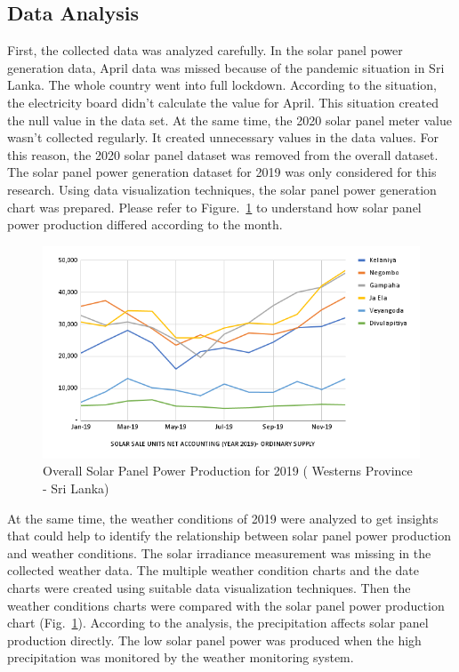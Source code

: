 \documentclass[conference]{IEEEtran}
\begin{document}
\subsection{Data Analysis}
First, the collected data was analyzed carefully. In the solar panel power generation data, April data was missed because of the pandemic situation in Sri Lanka. The whole country went into full lockdown. According to the situation, the electricity board didn't calculate the value for April. This situation created the null value in the data set. At the same time, the 2020 solar panel meter value wasn't collected regularly. It created unnecessary values in the data values. For this reason, the 2020 solar panel dataset was removed from the overall dataset. The solar panel power generation dataset for 2019 was only considered for this research. Using data visualization techniques, the solar panel power generation chart was prepared. Please refer to Figure.~\ref{fig:SolarPowerProduction} to understand how solar panel power production differed according to the month.

\begin{figure}[hbp]
    \centering
    \includegraphics[width=\linewidth]{Images/chart.png}
    \caption{Overall Solar Panel Power Production for 2019 ( Westerns Province - Sri Lanka)}
    \label{fig:SolarPowerProduction}
\end{figure}

At the same time, the weather conditions of 2019 were analyzed to get insights that could help to identify the relationship between solar panel power production and weather conditions. The solar irradiance measurement was missing in the collected weather data. The multiple weather condition charts and the date charts were created using suitable data visualization techniques. Then the weather conditions charts were compared with the solar panel power production chart (Fig.~\ref{fig:SolarPowerProduction}). According to the analysis, the precipitation affects solar panel production directly. The low solar panel power was produced when the high precipitation was monitored by the weather monitoring system.
\end{document}

